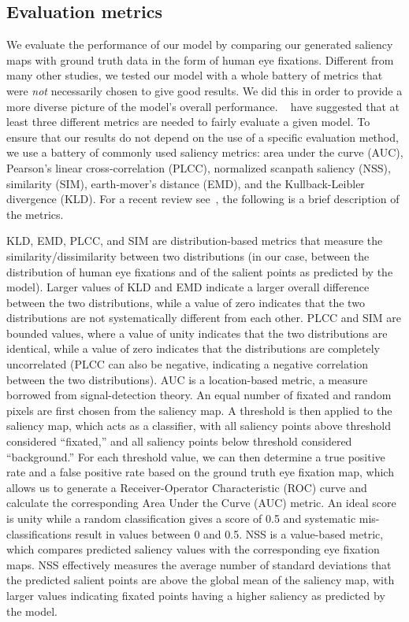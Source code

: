 \subsection{Evaluation metrics}

We evaluate the performance of our model by comparing our generated saliency maps with ground truth data in the form of human eye fixations. Different from many other studies, we tested our model with a whole battery of metrics that were {\em not} necessarily chosen to give good results. We did this in order to provide a more diverse picture of the model's overall performance. ~\cite{Riche_etal13} have suggested that at least three different metrics are needed to fairly evaluate a given model. To ensure that our results do not depend on the use of a specific evaluation method, we use a battery of commonly used saliency metrics: area under the curve (AUC), Pearson's linear cross-correlation (PLCC), normalized scanpath saliency (NSS), similarity (SIM), earth-mover's distance (EMD), and the Kullback-Leibler divergence (KLD). For a recent review see~\cite{Riche_etal13}, the following is a brief description of the metrics.

KLD, EMD, PLCC, and SIM are distribution-based metrics that measure the similarity/dissimilarity between two distributions (in our case, between the distribution of human eye fixations and of the salient points as predicted by the model). Larger values of KLD and EMD indicate a larger overall difference between the two distributions, while a value of zero indicates that the two distributions are not systematically different from each other. PLCC and SIM are bounded values, where a value of unity indicates that the two distributions are identical, while a value of zero indicates that the distributions are completely uncorrelated (PLCC can also be negative, indicating a negative correlation between the two distributions). AUC is a location-based metric, a measure borrowed from signal-detection theory. An equal number of fixated and random pixels are first chosen from the saliency map. A threshold is then applied to the saliency map, which acts as a classifier, with all saliency points above threshold considered ``fixated,'' and all saliency points below threshold considered ``background.'' For each threshold value, we can then determine a true positive rate and a false positive rate based on the ground truth eye fixation map, which allows us to generate a Receiver-Operator Characteristic (ROC) curve and calculate the corresponding Area Under the Curve (AUC) metric. An ideal score is unity while a random classification gives a score of 0.5 and systematic mis-classifications result in values between 0 and 0.5. NSS is a value-based metric, which compares predicted saliency values with the corresponding eye fixation maps. NSS effectively measures the average number of standard deviations that the predicted salient points are above the global mean of the saliency map, with larger values indicating fixated points having a higher saliency as predicted by the model.

